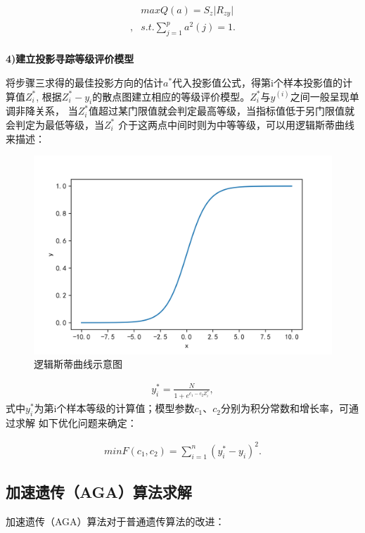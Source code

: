 \documentclass{whutmod}
\begin{document}
\begin{spacing}{1.2}
\begin{equation}
	\label{2}
	\begin{split}
	&max Q(a)=S_z\lvert R_{zy} \rvert\\,
	&s.t. \sum_{j=1}^pa^2(j)=1.
	\end{split}
\end{equation}
~\\
\textbf{4)建立投影寻踪等级评价模型}

将步骤三求得的最佳投影方向的估计$a^*$代入投影值公式，得第i个样本投影值的计算值$Z^*_i$,
根据$Z^*_i-y_i$的散点图建立相应的等级评价模型。$Z^*_i$与$y^(i)$之间一般呈现单调非降关系，
当$Z^*_i$值超过某门限值就会判定最高等级，当指标值低于另门限值就会判定为最低等级，当$Z^*_i$
介于这两点中间时则为中等等级，可以用逻辑斯蒂曲线来描述：

\begin{figure}[H]
	\centering
	\includegraphics[width=.5\textwidth]{逻辑斯蒂.png}
	\caption{逻辑斯蒂曲线示意图}
	\label{变化趋势2}
\end{figure}

\begin{equation}
	\label{2}
	\begin{split}
    y_i^*=\frac{N}{1+e^{c_1-c_2Z^*_i}},
	\end{split}
\end{equation}
式中$y_i^*$为第i个样本等级的计算值；模型参数$c_1$、$c_2$分别为积分常数和增长率，可通过求解
如下优化问题来确定：

\begin{equation}
	\label{2}
	\begin{split}
    min F(c_1,c_2)=\sum_{i=1}^n(y_i^*-y_i)^2.
	\end{split}
\end{equation}

\subsection{加速遗传（AGA）算法求解}

加速遗传（AGA）算法对于普通遗传算法的改进：


\end{spacing}
\end{document}
